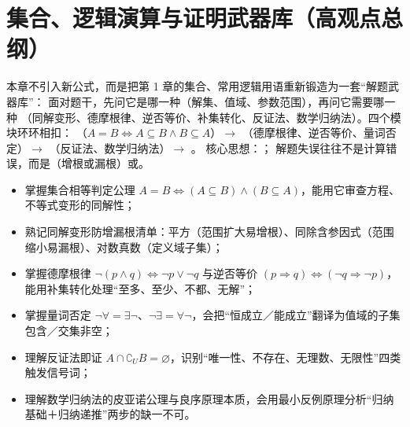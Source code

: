 
\section{集合、逻辑演算与证明武器库（高观点总纲）}

本章不引入新公式，而是把第 1 章的集合、常用逻辑用语重新锻造为一套“解题武器库”：
面对题干，先问它是哪一种（解集、值域、参数范围），再问它需要哪一种
（同解变形、德摩根律、逆否等价、补集转化、反证法、数学归纳法）。四个模块环环相扣：
（$A=B\iff A\subseteq B\land B\subseteq A$）$\to$
（德摩根律、逆否等价、量词否定）$\to$
（反证法、数学归纳法）$\to$
。
核心思想：；
解题失误往往不是计算错误，而是（增根或漏根）或。

\begin{learnobjective}
\begin{itemize}
  \item 掌握集合相等判定公理 $A=B\iff(A\subseteq B)\land(B\subseteq A)$，能用它审查方程、不等式变形的同解性；
  \item 熟记同解变形防增漏根清单：平方（范围扩大易增根）、同除含参因式（范围缩小易漏根）、对数真数（定义域子集）；
  \item 掌握德摩根律 $\neg(p\land q)\iff\neg p\lor\neg q$ 与逆否等价 $(p\Rightarrow q)\iff(\neg q\Rightarrow\neg p)$，能用补集转化处理“至多、至少、不都、无解”；
  \item 掌握量词否定 $\neg\forall=\exists\neg$、$\neg\exists=\forall\neg$，会把“恒成立／能成立”翻译为值域的子集包含／交集非空；
  \item 理解反证法即证 $A\cap\complement_U B=\varnothing$，识别“唯一性、不存在、无理数、无限性”四类触发信号词；
  \item 理解数学归纳法的皮亚诺公理与良序原理本质，会用最小反例原理分析“归纳基础＋归纳递推”两步的缺一不可。
\end{itemize}
\end{learnobjective}

